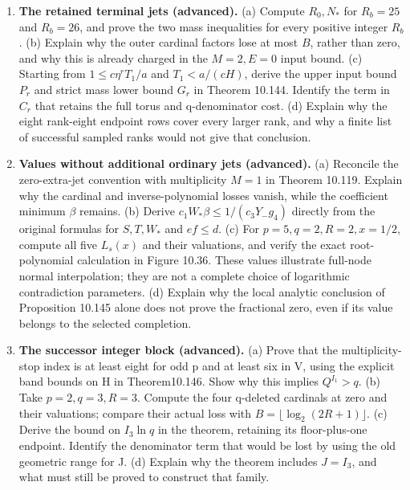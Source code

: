\documentclass[
  11pt,
  a4paper,
]{article}
\begin{document}
\begin{enumerate}
  scalar values illustrate the stopping definition, rather than a full
  choice of original contradiction parameters. (b) Show why replacing
  floor plus one by a ceiling in the definition of \(I_2\) fails at an
  integer quotient. (c) Verify the rational equality
  \(5220/(7\cdot9\cdot2^{13})=145/14336\), and explain why the strict
  coordinate bound in Proposition 10.143 leaves only the origin in the
  integral torus support. Explain why the resulting nonzero additive
  polynomial cannot have the stated number of integer roots.
\item
  \textbf{The retained terminal jets (advanced).} (a) Compute
  \(R_0,N_*\) for \(R_b=25\) and \(R_b=26\), and prove the two mass
  inequalities for every positive integer \(R_b\). (b) Explain why the
  outer cardinal factors lose at most \(B\), rather than zero, and why
  this is already charged in the \(M=2,E=0\) input bound. (c) Starting
  from \(1\le c\eta^rT_1/a\) and \(T_1<a/(cH)\), derive the upper input
  bound \(P_r\) and strict mass lower bound \(G_r\) in Theorem 10.144.
  Identify the term in \(C_r\) that retains the full torus and
  q-denominator cost. (d) Explain why the eight rank-eight endpoint rows
  cover every larger rank, and why a finite list of successful sampled
  ranks would not give that conclusion.
\item
  \textbf{Values without additional ordinary jets (advanced).} (a)
  Reconcile the zero-extra-jet convention with multiplicity \(M=1\) in
  Theorem 10.119. Explain why the cardinal and inverse-polynomial losses
  vanish, while the coefficient minimum \(\beta\) remains. (b) Derive
  \(c_1W_*\beta\le1/(c_3Y_-g_4)\) directly from the original formulas
  for \(S,T,W_*\) and \(ef\le d\). (c) For \(p=5,q=2,R=2,x=1/2\),
  compute all five \(L_s(x)\) and their valuations, and verify the exact
  root-polynomial calculation in Figure 10.36. These values illustrate
  full-node normal interpolation; they are not a complete choice of
  logarithmic contradiction parameters. (d) Explain why the local
  analytic conclusion of Proposition 10.145 alone does not prove the
  fractional zero, even if its value belongs to the selected completion.
\item
  \textbf{The successor integer block (advanced).} (a) Prove that the
  multiplicity-stop index is at least eight for odd p and at least six
  in V, using the explicit band bounds on H in Theorem10.146. Show why
  this implies \(Q^{I_1}>q\). (b) Take \(p=2,q=3,R=3\). Compute the four
  q-deleted cardinals at zero and their valuations; compare their actual
  loss with \(B=\lfloor\log_2(2R+1)\rfloor\). (c) Derive the bound on
  \(I_3\ln q\) in the theorem, retaining its floor-plus-one endpoint.
  Identify the denominator term that would be lost by using the old
  geometric range for J. (d) Explain why the theorem includes \(J=I_3\),
  and what must still be proved to construct that family.
\end{enumerate}
\end{document}
